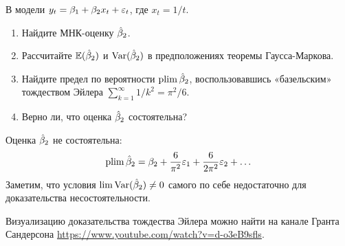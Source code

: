 \begin{problem}
В модели $y_t=\beta_1+\beta_2 x_t + \varepsilon_t$, где $x_t=1/t$.
\begin{enumerate}
\item Найдите МНК-оценку $\hat{\beta}_2$.
\item Рассчитайте $\mathbb{E}(\hat{\beta}_2)$ и $\operatorname{Var}(\hat{\beta}_2)$ в предположениях теоремы Гаусса-Маркова.
\item Найдите предел по вероятности $\operatorname*{plim} \hat{\beta}_2$, воспользовавшись «базельским» тождеством Эйлера $\sum_{k=1}^{\infty} 1/k^2 = \pi^2/6$.
\item Верно ли, что оценка $\hat{\beta}_2$ состоятельна? 
\end{enumerate}


\begin{sol}
Оценка $\hat{\beta}_2$ не состоятельна:
\[
\operatorname*{plim} \hat{\beta}_2 = \beta_2 + \frac{6}{\pi^2}\varepsilon_1 + \frac{6}{2\pi^2}\varepsilon_2 + \ldots
\]
Заметим, что условия $\lim \operatorname{Var}(\hat{\beta}_2) \neq 0$ самого по себе недостаточно для доказательства несостоятельности.

Визуализацию доказательства тождества Эйлера можно найти на канале Гранта Сандерсона \url{https://www.youtube.com/watch?v=d-o3eB9sfls}.
\end{sol}
\end{problem}



